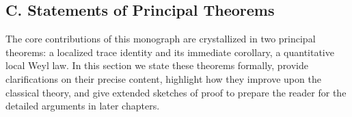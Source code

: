 
\subsection*{C. Statements of Principal Theorems}
\label{sub:intro-mainthms}

The core contributions of this monograph are crystallized in two principal theorems: 
a localized trace identity and its immediate corollary, a quantitative local Weyl law. 
In this section we state these theorems formally, provide clarifications on their precise content, 
highlight how they improve upon the classical theory, and give extended sketches of proof to prepare the reader 
for the detailed arguments in later chapters.

\medskip

